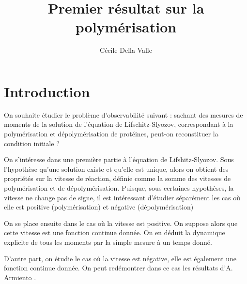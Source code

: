 \documentclass[a4paper]{article}
\title{Premier résultat sur la polymérisation}
\author{Cécile Della Valle}
\begin{document}
\maketitle

\section{Introduction}

On souhaite étudier le problème d'observabilité suivant : sachant des mesures de moments de la solution de l'équation de Lifschitz-Slyozov, correspondant à la polymérisation et dépolymérisation de protéines, peut-on reconstituer la condition initiale ?

On s'intéresse dans une première partie à l'équation de Lifshitz-Slyozov. 
Sous l'hypothèse qu'une solution existe et qu'elle est unique, alors on obtient des propriétés sur la vitesse de réaction, définie comme la somme des vitesses de polymérisation et de dépolymérisation.
Puisque, sous certaines hypothèses, la vitesse ne change pas de signe, il est intéressant d'étudier séparément les cas où elle est positive (polymérisation) et négative (dépolymérisation)


On se place ensuite dans le cas où la vitesse est positive. On suppose alors que cette vitesse est une fonction continue donnée. 
On en déduit la dynamique explicite de tous les moments par la simple mesure à un temps donné.

D'autre part, on étudie le cas où la vitesse est négative, elle est également une fonction continue donnée. On peut redémontrer dans ce cas les résultats d'A. Armiento \cite{AArmiento}.

 


\end{document}
